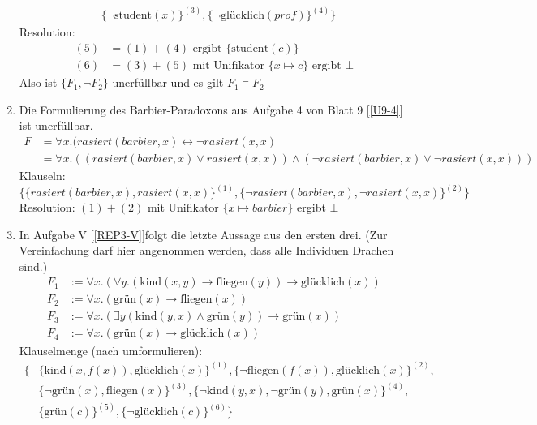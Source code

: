 \begin{enumerate}
\begin{align*}
&\{\neg\text{student}(x)\}^{(3)}, \{\neg\text{glücklich}(prof)\}^{(4)}\}
\end{align*}
Resolution:
\begin{align*}
(5) &= (1) + (4) \text{ ergibt } \{\text{student}(c)\} \\
(6) &= (3) + (5) \text{ mit Unifikator } \{x \mapsto c\} \text{ ergibt } \bot
\end{align*}
Also ist $\{F_1, \neg F_2\}$ unerfüllbar und es gilt $F_1 \models F_2$
\item Die Formulierung des Barbier-Paradoxons aus Aufgabe 4 von Blatt 9 [\ref{U9-4}] ist unerfüllbar. \\
\LOES 
\begin{align*}
F &= \forall x.(rasiert(barbier, x) \leftrightarrow \neg rasiert(x,x) \\
&= \forall x.((rasiert(barbier,x) \lor rasiert(x,x)) \land (\neg rasiert(barbier,x) \lor \neg rasiert(x,x)))
\end{align*}
Klauseln:
\begin{equation*}
\{\{rasiert(barbier,x),rasiert(x,x)\}^{(1)}, \{\neg rasiert(barbier, x), \neg rasiert(x,x)\}^{(2)}\}
\end{equation*}
Resolution: $(1) + (2)$ mit Unifikator $\{x \mapsto barbier\}$ ergibt $\bot$
\item In Aufgabe V [\ref{REP3-V}]folgt die letzte Aussage aus den ersten drei. (Zur Vereinfachung darf hier angenommen werden, dass alle Individuen Drachen sind.) \\
\LOES
\begin{align*}
F_1 &:= \forall x.(\forall y.(\text{kind}(x,y) \to \text{fliegen}(y)) \to \text{glücklich}(x)) \\
F_2 &:= \forall x.(\text{grün}(x) \to \text{fliegen}(x)) \\
F_3 &:= \forall x.(\exists y(\text{kind}(y, x) \land \text{grün}(y)) \to \text{grün}(x)) \\
F_4 &:= \forall x.(\text{grün}(x) \to \text{glücklich}(x))
\end{align*}
Klauselmenge (nach umformulieren):
\begin{align*}
\{&\{\text{kind}(x,f(x)), \text{glücklich}(x)\}^{(1)},\{\neg\text{fliegen}(f(x)), \text{glücklich}(x)\}^{(2)}, \\
&\{\neg\text{grün}(x), \text{fliegen}(x)\}^{(3)}, \{\neg\text{kind}(y,x), \neg\text{grün}(y), \text{grün}(x) \}^{(4)}, \\
&\{\text{grün}(c)\}^{(5)}, \{\neg\text{glücklich}(c)\}^{(6)}\}
\end{align*}

\end{enumerate}
